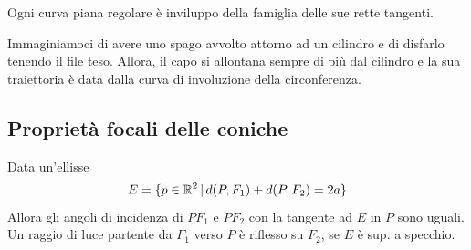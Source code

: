 \documentclass[a4paper]{article}
\begin{document}
\begin{radioactive}
\begin{snippetproposition}{}
    Ogni curva piana regolare è inviluppo della famiglia delle sue rette tangenti.
\end{snippetproposition}
\end{radioactive}

Immaginiamoci di avere uno spago
avvolto attorno ad un cilindro e di disfarlo
tenendo il file teso. Allora, il capo si allontana sempre di più dal cilindro
e la sua traiettoria è data dalla curva di involuzione della circonferenza.

\subsection{Proprietà focali delle coniche}

\begin{snippetproposition}{}
    Data un'ellisse \[
        E = \{ p \in \mathbb{R}^2 \,|\, d(P, F_1) + d(P, F_2) = 2a \}
    \]
    Allora gli angoli di incidenza di \(PF_1\) e \(PF_2\)
    con la tangente ad \(E\) in \(P\) sono uguali.
    Un raggio di luce partente da \(F_1\) verso \(P\)
    è riflesso su \(F_2\), se \(E\) è sup. a specchio.
\end{snippetproposition}
\end{document}
